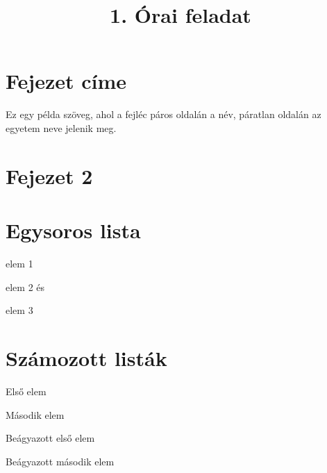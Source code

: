 \documentclass[12pt, twoside]{article}
\renewcommand{\footrulewidth}{0.4pt} %
\begin{document}
\title{1. Órai feladat}
\maketitle
\thispagestyle{plain} 
\fancyfoot[RO]{\thepage}
\renewcommand{\footrulewidth}{0.4pt}

\pagestyle{myheadings}

\section{Fejezet címe}
Ez egy példa szöveg, ahol a fejléc páros oldalán a név, páratlan oldalán az egyetem neve jelenik meg.

\newpage

\section{Fejezet 2}
\lipsum[1-4]

\newpage

\section{Egysoros lista}


\makeatletter
\newcommand{\lastitem}{\@ifnextchar\@endpefalse\relax és }
\makeatother

\begin{anditemize}
    \item elem 1
    \item elem 2
    \lastitem\item elem 3
\end{anditemize}

\newpage

\section{Számozott listák}

\begin{myenum}
    \item Első elem
    \item Második elem
    \begin{myenum}
        \item Beágyazott első elem
        \item Beágyazott második elem
    \end{myenum}
\end{myenum}
\end{document}
